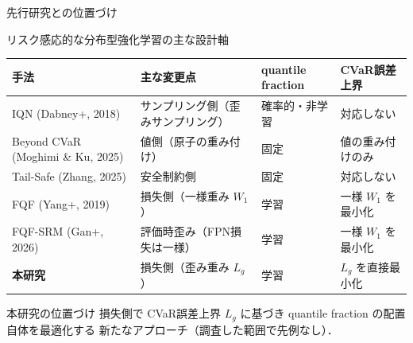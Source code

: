 \documentclass[aspectratio=169, 10pt]{beamer}
\newcommand{\green}[1]{\textcolor{green!40!black}{#1}}
\newcommand{\Lg}{L_g}
\begin{document}
\begin{frame}{先行研究との位置づけ}
  \begin{block}{リスク感応的な分布型強化学習の主な設計軸}
    \centering
    \scriptsize
    \setlength{\tabcolsep}{3pt}
    \begin{tabular}{@{}llll@{}}
      \toprule
      手法 & 主な変更点 & quantile fraction & CVaR誤差上界 \\
      \midrule
      IQN (Dabney+, 2018) & サンプリング側（歪みサンプリング） & 確率的・非学習 & 対応しない \\
      Beyond CVaR (Moghimi \& Ku, 2025) & 値側（原子の重み付け） & 固定 & 値の重み付けのみ \\
      Tail-Safe (Zhang, 2025) & 安全制約側 & 固定 & 対応しない \\
      FQF (Yang+, 2019) & 損失側（一様重み $W_1$） & \green{学習} & 一様 $W_1$ を最小化 \\
      FQF-SRM (Gan+, 2026) & 評価時歪み（FPN損失は一様） & \green{学習} & 一様 $W_1$ を最小化 \\
      \textbf{本研究} & \alert{損失側（歪み重み $\Lg$）} & \green{学習} & \alert{$\Lg$ を直接最小化} \\
      \bottomrule
    \end{tabular}
  \end{block}
  \begin{exampleblock}{本研究の位置づけ}
    \alert{損失側}で CVaR誤差上界 $\Lg$ に基づき quantile fraction の\alert{配置自体}を最適化する
    新たなアプローチ（調査した範囲で先例なし）．
  \end{exampleblock}
\end{frame}
\end{document}
